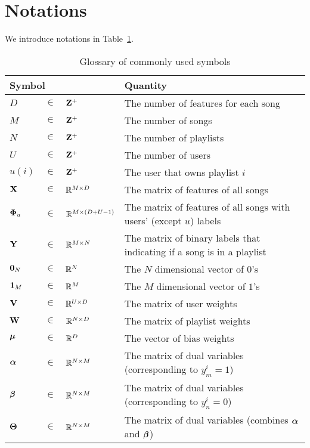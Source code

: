 \section{Notations}

We introduce notations in Table~\ref{tab:symbol_tpush}.
\begin{table}[!h]
\caption{Glossary of commonly used symbols}
\label{tab:symbol_tpush}
\renewcommand{\arraystretch}{1.5} %
\setlength{\tabcolsep}{1pt} %
\centering
\begin{tabular}{llll}
\toprule
\multicolumn{3}{l}{\textbf{Symbol}} & \textbf{Quantity} \\ \midrule
$D$        &  $\in$  &  $\mathbf{Z}^+$            & The number of features for each song \\
$M$        &  $\in$  &  $\mathbf{Z}^+$            & The number of songs \\
$N$        &  $\in$  &  $\mathbf{Z}^+$            & The number of playlists \\
$U$        &  $\in$  &  $\mathbf{Z}^+$            & The number of users \\
$u(i)$     &  $\in$  &  $\mathbf{Z}^+$            & The user that owns playlist $i$ \\
$\mathbf{X}$       &  $\in$  &  $\mathbb{R}^{M \times D}$ & The matrix of features of all songs \\
$\mathbf{\Phi}_u$ &  $\in$  &  $\mathbb{R}^{M \times (D + U -1)}$ & The matrix of features of all songs with users' (except $u$) labels \\
$\mathbf{Y}$       &  $\in$  &  $\mathbb{R}^{M \times N}$ & The matrix of binary labels that indicating if a song is in a playlist \\
$\mathbf{0}_N$  &  $\in$  &  $\mathbb{R}^N$            & The $N$ dimensional vector of $0$'s \\
$\mathbf{1}_M$   &  $\in$  &  $\mathbb{R}^M$            & The $M$ dimensional vector of $1$'s \\
$\mathbf{V}$       &  $\in$  &  $\mathbb{R}^{U \times D}$ & The matrix of user weights \\
$\mathbf{W}$       &  $\in$  &  $\mathbb{R}^{N \times D}$ & The matrix of playlist weights \\
$\bm{\mu}$    &  $\in$  &  $\mathbb{R}^D$            & The vector of bias weights \\
${\bm{\alpha}}$ &  $\in$  &  $\mathbb{R}^{N \times M}$ & The matrix of dual variables (corresponding to $y_m^i=1$) \\
${\bm{\beta}}$  &  $\in$  &  $\mathbb{R}^{N \times M}$ & The matrix of dual variables (corresponding to $y_n^i=0$) \\
$\mathbf{\Theta}$ &  $\in$  &  $\mathbb{R}^{N \times M}$ & The matrix of dual variables (combines ${\bm{\alpha}}$ and ${\bm{\beta}}$) \\
\bottomrule
\end{tabular}
\end{table}
